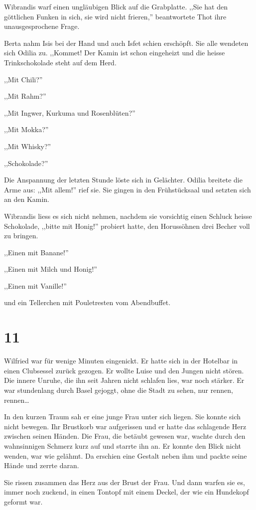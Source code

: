 \documentclass[11pt,titlepage,a5paper]{book}
\begin{document}
Wibrandis warf einen ungläubigen Blick auf die Grabplatte. ,,Sie hat den göttlichen Funken in sich, sie wird nicht frieren,'' beantwortete Thot ihre unausgesprochene Frage.

Berta nahm Isis bei der Hand und auch Isfet schien erschöpft. Sie alle wendeten sich Odilia zu. ,,Kommet! Der Kamin ist schon eingeheizt und die heisse Trinkschokolade steht auf dem Herd.

,,Mit Chili?''

,,Mit Rahm?''

,,Mit Ingwer, Kurkuma und Rosenblüten?''

,,Mit Mokka?''

,,Mit Whisky?''

,,Schokolade?''

Die Anspannung der letzten Stunde löste sich in Gelächter. Odilia breitete die Arme aus: ,,Mit allem!'' rief sie. Sie gingen in den Frühstücksaal und setzten sich an den Kamin.

Wibrandis liess es sich nicht nehmen, nachdem sie vorsichtig einen Schluck heisse Schokolade, ,,bitte mit Honig!'' probiert hatte, den Horussöhnen drei Becher voll zu bringen.

,,Einen mit Banane!''

,,Einen mit Milch und Honig!''

,,Einen mit Vanille!''

und ein Tellerchen mit Pouletresten vom Abendbuffet.

\section*{11}

Wilfried war für wenige Minuten eingenickt. Er hatte sich in der Hotelbar in einen Clubsessel zurück gezogen. Er wollte Luise und den Jungen nicht stören. Die innere Unruhe, die ihn seit Jahren nicht schlafen lies, war noch stärker. Er war stundenlang durch Basel gejoggt, ohne die Stadt zu sehen, nur rennen, rennen\dots

In den kurzen Traum sah er eine junge Frau unter sich liegen. Sie konnte sich nicht bewegen. Ihr Brustkorb war aufgerissen und er hatte das schlagende Herz zwischen seinen Händen. Die Frau, die betäubt gewesen war, wachte durch den wahnsinnigen Schmerz kurz auf und starrte ihn an. Er konnte den Blick nicht wenden, war wie gelähmt. Da erschien eine Gestalt neben ihm und packte seine Hände und zerrte daran. 

Sie rissen zusammen das Herz aus der Brust der Frau. Und dann warfen sie es, immer noch zuckend, in einen Tontopf mit einem Deckel, der wie ein Hundekopf geformt war.
\end{document}
